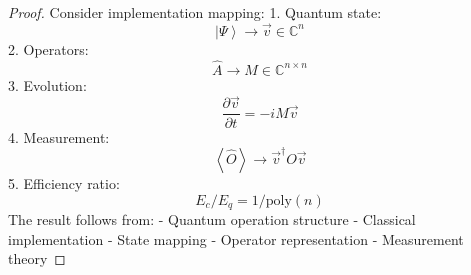 \documentclass[12pt]{article}
\newcommand{\ket}[1]{\left|#1\right\rangle}
\newcommand{\expect}[1]{\left\langle#1\right\rangle}
\newcommand{\Complex}{\mathbb{C}}
\newcommand{\op}[1]{\hat{#1}}
\begin{document}
\begin{proof}
Consider implementation mapping:
1. Quantum state:
\begin{equation}
\ket{\Psi} \rightarrow \vec{v} \in \Complex^n
\end{equation}
2. Operators:
\begin{equation}
\op{A} \rightarrow M \in \Complex^{n\times n}
\end{equation}
3. Evolution:
\begin{equation}
\frac{\partial\vec{v}}{\partial t} = -iM\vec{v}
\end{equation}
4. Measurement:
\begin{equation}
\expect{\op{O}} \rightarrow \vec{v}^\dagger O\vec{v}
\end{equation}
5. Efficiency ratio:
\begin{equation}
E_c/E_q = 1/\text{poly}(n)
\end{equation}
The result follows from:
- Quantum operation structure
- Classical implementation
- State mapping
- Operator representation
- Measurement theory
\end{proof}
\end{document}
